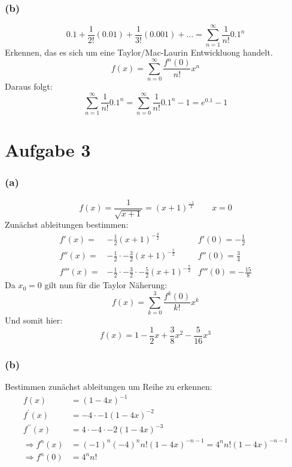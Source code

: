 \documentclass[]{article}
\begin{document}
\hypertarget{b}{%
\subsubsection{(b)}\label{b}}

\[
    0.1+\frac{1}{2 !}(0.01)+\frac{1}{3 !}(0.001)+\ldots= \sum_{n=1}^\infty \frac{1}{n!} 0.1^n
\] Erkennen, das es sich um eine Taylor/Mac-Laurin Entwickluong handelt.
\[
    f(x) = \sum_{n=0}^\infty \frac{f^n(0)}{n!} x^n
\] Daraus folgt: \[
    \sum_{n=1}^\infty \frac{1}{n!} 0.1^n = \sum_{n=0}^\infty \frac{1}{n!} 0.1^n - 1 = e^{0.1} -1
\]

\hypertarget{aufgabe-3}{%
\section{Aufgabe 3}\label{aufgabe-3}}

\hypertarget{a-1}{%
\subsubsection{(a)}\label{a-1}}

\[f(x) = \frac{1}{\sqrt{x+1}} = \left( x+1 \right)^{\frac{-1}{2}}\quad \quad x = 0\]
Zunächst ableitungen bestimmen: \[
\begin{array}{ccc}
    f'(x) =& - \frac{1}{2} (x+1)^{-\frac{3}{2}} & f'(0) = -\frac{1}{2}\\
    f''(x) =& - \frac{1}{2} \cdot -\frac{3}{2}(x+1)^{-\frac{5}{2}} & f''(0) = \frac{3}{4}\\
    f'''(x) =& - \frac{1}{2} \cdot -\frac{3}{2} \cdot -\frac{5}{2}(x+1)^{-\frac{7}{2}} & f'''(0) = -\frac{15}{8}
\end{array}
\] Da \(x_0 = 0\) gilt nun für die Taylor Näherung: \[
    f(x) = \sum_{k=0}^3 \frac{f^k(0)}{k!} x^k
\] Und somit hier: \[
    f(x) = 1 - \frac{1}{2}x + \frac{3}{8} x^2 - \frac{5}{16} x^3
\]

\hypertarget{b-1}{%
\subsubsection{(b)}\label{b-1}}

Bestimmen zunächst ableitungen um Reihe zu erkennen: \[
\begin{array}{rl}
    f(x)&=(1-4 x)^{-1} \\ f^{\prime}(x)&=-4 \cdot -1(1-4 x)^{-2} \\
    f^{\prime \prime}(x)&=4 \cdot  -4 \cdot -2(1-4 x)^{-3} \\
    \Rightarrow f^{n}(x)&=(-1)^n(-4)^{n} n!(1-4 x)^{-n-1}=4^{n} n! (1-4 x)^{-n-1}\\
    \Rightarrow f^{n}(0) &= 4^n n!
\end{array}
\]
\end{document}
